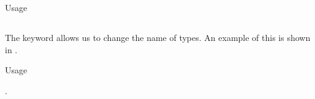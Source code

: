\begin{listing}[h!tbp]
\caption{\texorpdfstring{}{\texttt{enum}} Usage}
\label{lst:enum_Usage}
\end{listing}

\subsection{\texorpdfstring{}{\texttt{typedef}}}\label{subsec:typedef}
The  keyword allows us to change the name of types.
An example of this is shown in .

\begin{listing}[h!tbp]
\caption{\texorpdfstring{}{\texttt{typedef}} Usage}
\label{lst:typedef_Usage}.
\end{listing}

